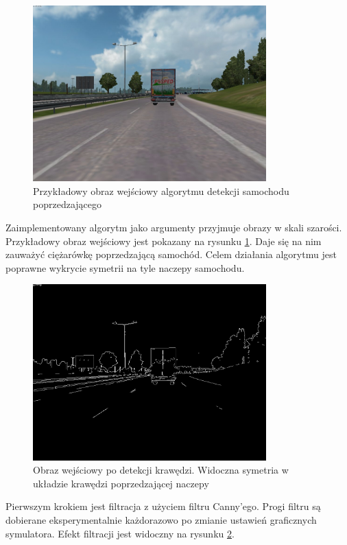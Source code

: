 \begin{figure}
  \centering
  \includegraphics[width=9cm]{img/alg3_input.jpg}
  \caption{Przykładowy obraz wejściowy algorytmu detekcji samochodu poprzedzającego}
  \label{fig:alg3_input}
\end{figure}

Zaimplementowany algorytm jako argumenty przyjmuje obrazy w skali szarości. %
Przykładowy obraz wejściowy jest pokazany na rysunku \ref{fig:alg3_input}. 
Daje się na nim zauważyć ciężarówkę poprzedzającą samochód. 
Celem działania algorytmu jest poprawne wykrycie symetrii na tyle naczepy samochodu.

\begin{figure}
  \centering
  \includegraphics[width=9cm]{img/alg3_canny.jpg}
  \caption{Obraz wejściowy po detekcji krawędzi. Widoczna symetria w układzie krawędzi poprzedzającej naczepy}
  \label{fig:alg3_canny}
\end{figure}

Pierwszym krokiem jest filtracja z użyciem filtru Canny'ego. 
Progi filtru są dobierane eksperymentalnie każdorazowo po zmianie ustawień graficznych symulatora. %
Efekt filtracji jest widoczny na rysunku \ref{fig:alg3_canny}.

